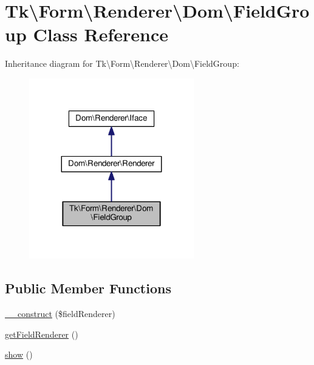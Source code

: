 \hypertarget{classTk_1_1Form_1_1Renderer_1_1Dom_1_1FieldGroup}{\section{Tk\textbackslash{}Form\textbackslash{}Renderer\textbackslash{}Dom\textbackslash{}Field\+Group Class Reference}
\label{classTk_1_1Form_1_1Renderer_1_1Dom_1_1FieldGroup}
}


Inheritance diagram for Tk\textbackslash{}Form\textbackslash{}Renderer\textbackslash{}Dom\textbackslash{}Field\+Group\+:\nopagebreak
\begin{figure}[H]
\begin{center}
\leavevmode
\includegraphics[width=203pt]{classTk_1_1Form_1_1Renderer_1_1Dom_1_1FieldGroup__inherit__graph}
\end{center}
\end{figure}
\subsection*{Public Member Functions}
\begin{DoxyCompactItemize}
\item 
\hyperlink{classTk_1_1Form_1_1Renderer_1_1Dom_1_1FieldGroup_ae49eb741ccb71564277601a8c08d2268}{\+\_\+\+\_\+construct} (\$field\+Renderer)
\item 
\hyperlink{classTk_1_1Form_1_1Renderer_1_1Dom_1_1FieldGroup_a3c53fa1a5be67558d74e76d2f1820087}{get\+Field\+Renderer} ()
\item 
\hyperlink{classTk_1_1Form_1_1Renderer_1_1Dom_1_1FieldGroup_afd18726c000171d11abfd6044d1e3b01}{show} ()
\end{DoxyCompactItemize}
